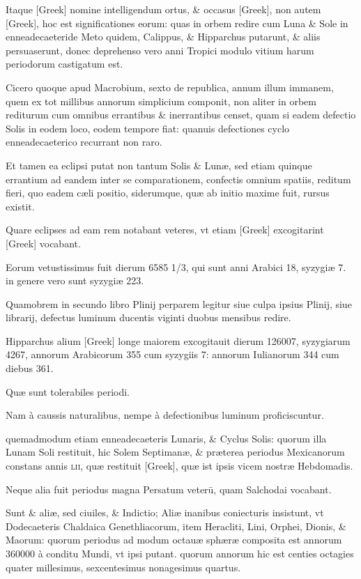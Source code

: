 \begin{parnumbers}

Itaque \textgreek{[Greek]} nomine intelligendum ortus,
 \& occasus \textgreek{[Greek]},
non autem \textgreek{[Greek]}, hoc est significationes
eorum: quas in orbem redire cum Luna \& Sole in enneadecaeteride
Meto quidem, Calippus, \& Hipparchus putarunt, \& aliis
persuaserunt, donec deprehenso vero anni Tropici modulo vitium
harum periodorum castigatum est.

Cicero quoque apud Macrobium,
sexto de republica, annum illum immanem, quem ex tot millibus
annorum simplicium componit, non aliter in orbem rediturum
cum omnibus errantibus \& inerrantibus censet, quam si eadem defectio
Solis in eodem loco, eodem tempore fiat: quanuis defectiones
cyclo enneadecaeterico recurrant non raro.

Et tamen ea eclipsi putat
non tantum Solis \& Lunæ, sed etiam quinque errantium ad eandem
inter se comparationem, confectis omnium spatiis, reditum fieri, quo
eadem cæli positio, siderumque, quæ ab initio maxime fuit, rursus existit.

Quare eclipses ad eam rem notabant veteres, vt etiam \textgreek{[Greek]}
excogitarint \textgreek{[Greek]} vocabant.

Eorum vetustissimus fuit
dierum 6585 1/3, qui sunt anni Arabici 18, syzygiæ 7. in genere vero
sunt syzygiæ 223.

Quamobrem in secundo libro Plinij perparem legitur
siue culpa ipsius Plinij, siue librarij, defectus luminum ducentis
viginti duobus mensibus redire.

Hipparchus alium \textgreek{[Greek]} longe
maiorem excogitauit dierum 126007, syzygiarum 4267, annorum
Arabicorum 355 cum syzygiis 7: annorum Iulianorum 344 cum
diebus 361.

Quæ sunt tolerabiles periodi.

Nam à caussis naturalibus,
nempe à defectionibus luminum proficiscuntur.

quemadmodum
etiam enneadecaeteris Lunaris, \& Cyclus Solis: quorum illa Lunam
Soli restituit, hic Solem Septimanæ, \& præterea periodus Mexicanorum
constans annis \textsc{lii}, quæ restituit \textgreek{[Greek]}, quæ ist ipsis
vicem nostræ Hebdomadis.

Neque alia fuit periodus magna Persatum
veterū, quam Salchodai vocabant.

Sunt \& aliæ, sed ciuiles, \& Indictio;
Aliæ inanibus coniecturis insistunt, vt Dodecaeteris Chaldaica
Genethliacorum, item Heracliti, Lini, Orphei, Dionis, \& Maorum:
quorum periodus ad modum octauæ sphæræ composita est annorum
360000 à conditu Mundi, vt ipsi putant. quorum annorum hic est
centies octagies quater millesimus, sexcentesimus nonagesimus quartus.


\end{parnumbers}
